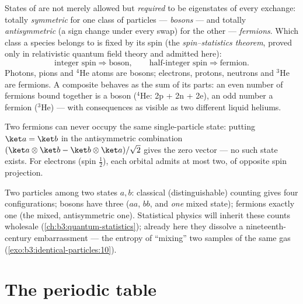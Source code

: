\begin{theorem}\label{thm:b3:identical-particles:postulate}
States of  are not merely allowed but
\emph{required} to be eigenstates of every exchange: totally
\emph{symmetric} for one class of particles --- \emph{bosons} ---
and totally \emph{antisymmetric} (a sign change under every swap)
for the other --- \emph{fermions}. Which class a species belongs to
is fixed by its spin (the \emph{spin--statistics theorem}, proved
only in relativistic quantum field theory and admitted here):
\[
\text{integer spin} \Rightarrow \text{boson} , \qquad
\text{half-integer spin} \Rightarrow \text{fermion} .
\]
Photons, pions and $^4$He atoms are bosons; electrons, protons,
neutrons and $^3$He are fermions.
A composite behaves as the sum of its parts: an even number of
fermions bound together is a boson ($^4$He: 2p + 2n + 2e), an odd
number a fermion ($^3$He) --- with consequences as visible as two
different liquid heliums.
\end{theorem}
\admitted

\begin{corollary}\label{cor:b3:identical-particles:pauli}
Two fermions can never occupy the same single-particle state: putting
$\ket a = \ket b$ in the antisymmetric combination
$(\ket a\otimes\ket b - \ket b\otimes\ket a)/\sqrt2$ gives the zero
vector --- no such state exists. For electrons (spin $\tfrac12$),
each orbital admits at most two, of opposite spin projection.
\end{corollary}

\begin{example}\label{ex:b3:identical-particles:counting}
Two particles among two states $a, b$: classical (distinguishable)
counting gives four configurations; bosons have three ($aa$, $bb$,
and \emph{one} mixed state); fermions exactly one (the mixed,
antisymmetric one). Statistical physics will inherit these counts
wholesale (\cref{ch:b3:quantum-statistics}); already here they
dissolve a nineteenth-century embarrassment --- the entropy of
``mixing'' two samples of the same gas
(\cref{exo:b3:identical-particles:10}).
\end{example}

\section{The periodic table}


